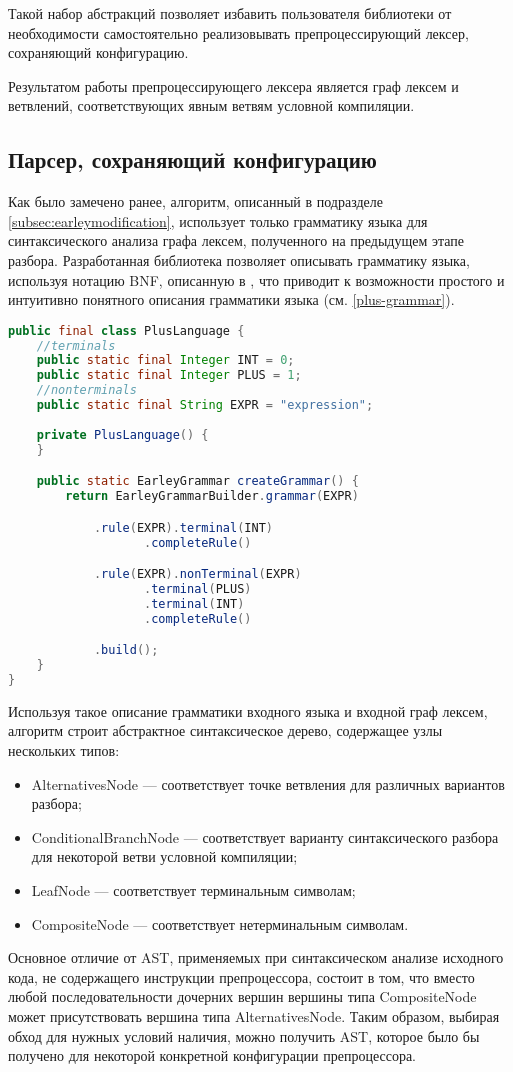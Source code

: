 Такой набор абстракций позволяет избавить пользователя библиотеки от необходимости самостоятельно реализовывать препроцессирующий лексер, сохраняющий конфигурацию.

Результатом работы препроцессирующего лексера является граф лексем и ветвлений, соответствующих явным ветвям условной компиляции.

\subsection{Парсер, сохраняющий конфигурацию}

Как было замечено ранее, алгоритм, описанный в подразделе \ref{subsec:earleymodification}, использует только грамматику языка для синтаксического анализа графа лексем, полученного на предыдущем этапе разбора. Разработанная библиотека позволяет описывать грамматику языка, используя нотацию BNF, описанную в \cite{cfg}, что приводит к возможности простого и интуитивно понятного описания грамматики языка  (см. \autoref{plus-grammar}).

\begin{lstlisting}[caption={Пример описания грамматики простого языка.},label=plus-grammar,language=Java]
public final class PlusLanguage {
	//terminals
	public static final Integer INT = 0;
	public static final Integer PLUS = 1;
	//nonterminals
	public static final String EXPR = "expression";
	
	private PlusLanguage() {
	}

	public static EarleyGrammar createGrammar() {
		return EarleyGrammarBuilder.grammar(EXPR)

			.rule(EXPR).terminal(INT)
				   .completeRule()

			.rule(EXPR).nonTerminal(EXPR)
				   .terminal(PLUS)
				   .terminal(INT)
				   .completeRule()

			.build();
	}
}
\end{lstlisting}

Используя такое описание грамматики входного языка и входной граф лексем, алгоритм строит абстрактное синтаксическое дерево, содержащее узлы нескольких типов:

\begin{itemize}
\item AlternativesNode --- соответствует точке ветвления для различных вариантов разбора;
\item ConditionalBranchNode --- соответствует варианту синтаксического разбора для некоторой ветви условной компиляции;
\item LeafNode --- соответствует терминальным символам;
\item CompositeNode --- соответствует нетерминальным символам.
\end{itemize}

Основное отличие от AST, применяемых при синтаксическом анализе исходного кода, не содержащего инструкции препроцессора, состоит в том, что вместо любой последовательности дочерних вершин вершины типа CompositeNode может присутствовать вершина типа AlternativesNode. Таким образом, выбирая обход для нужных условий наличия, можно получить AST, которое было бы получено для некоторой конкретной конфигурации препроцессора.


